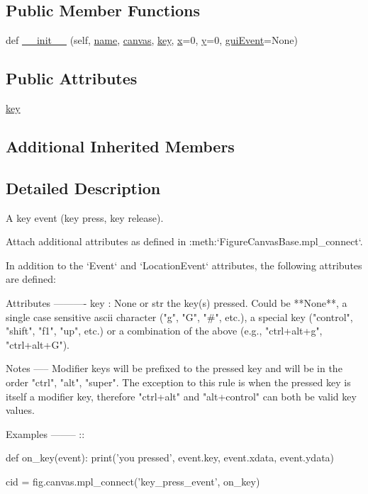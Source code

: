 \subsection*{Public Member Functions}
\begin{DoxyCompactItemize}
\item 
def \hyperlink{classmatplotlib_1_1backend__bases_1_1KeyEvent_afab0554b1d029f72d60ef34bcca47211}{\+\_\+\+\_\+init\+\_\+\+\_\+} (self, \hyperlink{classmatplotlib_1_1backend__bases_1_1Event_a4b10ea7af7c8a0b20bcdbb9ca03e1654}{name}, \hyperlink{classmatplotlib_1_1backend__bases_1_1Event_a7721d867d81a1255b1aeb51babec4e14}{canvas}, \hyperlink{classmatplotlib_1_1backend__bases_1_1KeyEvent_a56e60bbb8d0a52741daff43b4e3320db}{key}, \hyperlink{classmatplotlib_1_1backend__bases_1_1LocationEvent_aad07eb863241b9e4a4bfce29833a693b}{x}=0, \hyperlink{classmatplotlib_1_1backend__bases_1_1LocationEvent_a77dbd95e105ce5a66024d85dac58943b}{y}=0, \hyperlink{classmatplotlib_1_1backend__bases_1_1Event_a6cc1dc3c9479b3e5f227f329037adb98}{gui\+Event}=None)
\end{DoxyCompactItemize}
\subsection*{Public Attributes}
\begin{DoxyCompactItemize}
\item 
\hyperlink{classmatplotlib_1_1backend__bases_1_1KeyEvent_a56e60bbb8d0a52741daff43b4e3320db}{key}
\end{DoxyCompactItemize}
\subsection*{Additional Inherited Members}


\subsection{Detailed Description}
\begin{DoxyVerb}A key event (key press, key release).

Attach additional attributes as defined in
:meth:`FigureCanvasBase.mpl_connect`.

In addition to the `Event` and `LocationEvent`
attributes, the following attributes are defined:

Attributes
----------
key : None or str
    the key(s) pressed. Could be **None**, a single case sensitive ascii
    character ("g", "G", "#", etc.), a special key
    ("control", "shift", "f1", "up", etc.) or a
    combination of the above (e.g., "ctrl+alt+g", "ctrl+alt+G").

Notes
-----
Modifier keys will be prefixed to the pressed key and will be in the order
"ctrl", "alt", "super". The exception to this rule is when the pressed key
is itself a modifier key, therefore "ctrl+alt" and "alt+control" can both
be valid key values.

Examples
--------
::

    def on_key(event):
        print('you pressed', event.key, event.xdata, event.ydata)

    cid = fig.canvas.mpl_connect('key_press_event', on_key)
\end{DoxyVerb}
 

